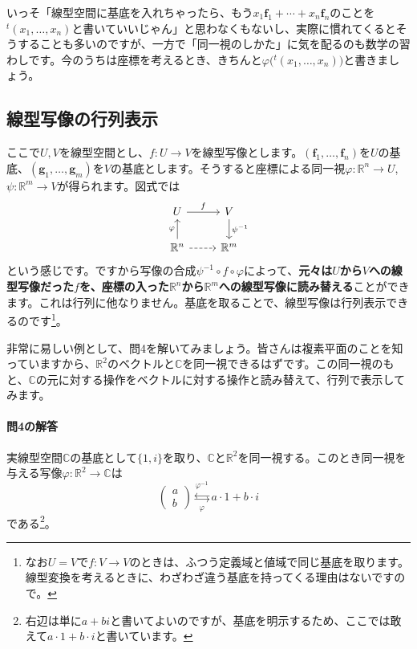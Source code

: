 いっそ「線型空間に基底を入れちゃったら、もう$x_1\bm{f}_1 + \cdots + x_n\bm{f}_n$のことを${}^t(x_1, \ldots, x_n)$と書いていいじゃん」と思わなくもないし、実際に慣れてくるとそうすることも多いのですが、一方で「同一視のしかた」に気を配るのも数学の習わしです。今のうちは座標を考えるとき、きちんと$\varphi\bigl({}^t(x_1, \ldots, x_n)\bigr)$と書きましょう。

\subsection{線型写像の行列表示}

ここで$U, V$を線型空間とし、$f\colon U\rightarrow V$を線型写像とします。$(\bm{f}_1, \ldots, \bm{f}_n)$を$U$の基底、$(\bm{g}_1, \ldots, \bm{g}_m)$を$V$の基底とします。そうすると座標による同一視$\varphi\colon \mathbb{R}^n\rightarrow U$, $\psi\colon\mathbb{R}^m\rightarrow V$が得られます。図式では
\[
\begin{tikzcd}
U \arrow{r}{f} & V \arrow{d}{\psi^{-1}} \\
\mathbb{R}^n \arrow{u}{\varphi} \arrow[dashed]{r} & \mathbb{R}^m
\end{tikzcd}
\]
という感じです。ですから写像の合成$\psi^{-1}\circ f\circ\varphi$によって、\textbf{元々は$U$から$V$への線型写像だった$f$を、座標の入った$\mathbb{R}^n$から$\mathbb{R}^m$への線型写像に読み替える}ことができます。これは行列に他なりません。基底を取ることで、線型写像は行列表示できるのです\footnote{なお$U = V$で$f\colon V \rightarrow V$のときは、ふつう定義域と値域で同じ基底を取ります。線型変換を考えるときに、わざわざ違う基底を持ってくる理由はないですので。}。

非常に易しい例として、問4を解いてみましょう。皆さんは複素平面のことを知っていますから、$\mathbb{R}^2$のベクトルと$\mathbb{C}$を同一視できるはずです。この同一視のもと、$\mathbb{C}$の元に対する操作をベクトルに対する操作と読み替えて、行列で表示してみます。

\paragraph{問4の解答} 実線型空間$\mathbb{C}$の基底として$\{1, i\}$を取り、$\mathbb{C}$と$\mathbb{R}^2$を同一視する。このとき同一視を与える写像$\varphi\colon \mathbb{R}^2 \rightarrow \mathbb{C}$は
\[
\begin{pmatrix}
a \\
b
\end{pmatrix}
\overset{\varphi^{-1}}{\underset{\varphi}{\leftrightarrows}} a\cdot 1 + b\cdot i
\]
である\footnote{右辺は単に$a + bi$と書いてよいのですが、基底を明示するため、ここでは敢えて$a\cdot 1 + b\cdot i$と書いています。}。

